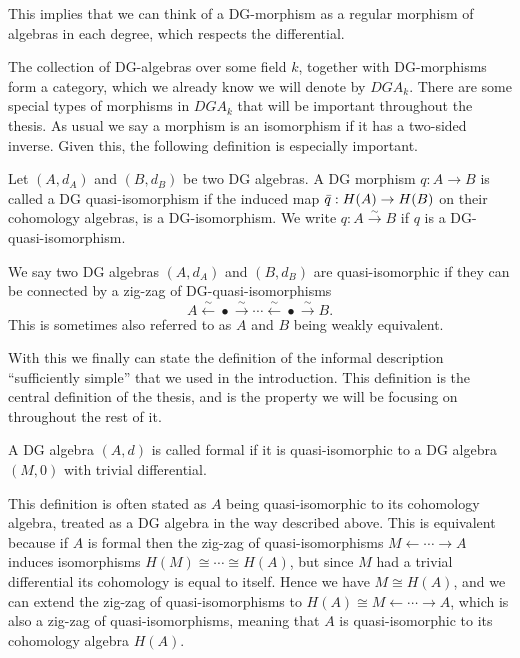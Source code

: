 This implies that we can think of a DG-morphism as a regular morphism of algebras in each degree, which respects the differential.

The collection of DG-algebras over some field $k$, together with DG-morphisms form a category, which we already know we will denote by $DGA_k$. There are some special types of morphisms in $DGA_k$ that will be important throughout the thesis. As usual we say a morphism is an isomorphism if it has a two-sided inverse. Given this, the following definition is especially important. 

\begin{definition}
    Let $(A, d_A)$ and $(B, d_B)$ be two DG algebras. A DG morphism $q:A\longrightarrow B$ is called a DG quasi-isomorphism if the induced map $\Bar{q}:H(A)\rightarrow H(B)$ on their cohomology algebras, is a DG-isomorphism. We write $q:A\overset{\sim}\longrightarrow B$ if $q$ is a DG-quasi-isomorphism. 
\end{definition}

\begin{definition}
    We say two DG algebras $(A, d_A)$ and $(B, d_B)$ are quasi-isomorphic if they can be connected by a zig-zag of DG-quasi-isomorphisms 
    \begin{equation*}
        A \overset{\sim}\longleftarrow \bullet \overset{\sim}\longrightarrow \cdots \overset{\sim}\longleftarrow \bullet \overset{\sim}\longrightarrow B .
    \end{equation*}
    This is sometimes also referred to as $A$ and $B$ being weakly equivalent. 
\end{definition}

With this we finally can state the definition of the informal description ``sufficiently simple'' that we used in the introduction. This definition is the central definition of the thesis, and is the property we will be focusing on throughout the rest of it. 

\begin{definition}
A DG algebra $(A, d)$ is called formal if it is quasi-isomorphic to a DG algebra $(M, 0)$ with trivial differential. 
\end{definition}

This definition is often stated as $A$ being quasi-isomorphic to its cohomology algebra, treated as a DG algebra in the way described above. This is equivalent because if $A$ is formal then the zig-zag of quasi-isomorphisms $M \leftarrow \cdots \rightarrow A$ induces isomorphisms $H(M)\cong \cdots \cong H(A)$, but since $M$ had a trivial differential its cohomology is equal to itself. Hence we have $M\cong H(A)$, and we can extend the zig-zag of quasi-isomorphisms to $H(A)\cong M \leftarrow \cdots \rightarrow A$, which is also a zig-zag of quasi-isomorphisms, meaning that $A$ is quasi-isomorphic to its cohomology algebra $H(A)$. 

